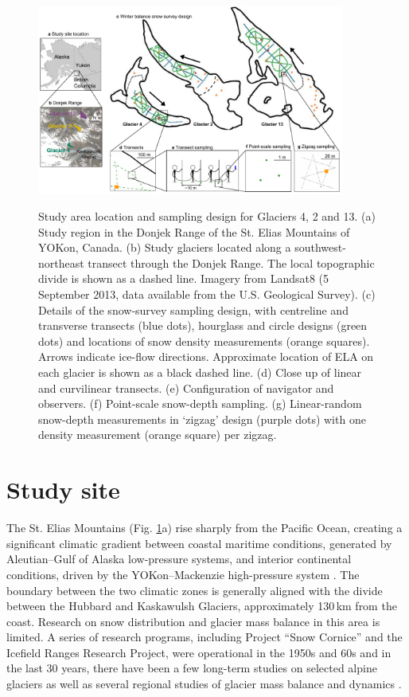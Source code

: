\documentclass[twocolumn, letterpaper]{igs}
\begin{document}
\begin{figure}
	\centering
	\includegraphics[width =0.9\textwidth]{Sampling.pdf}\\
	\caption{Study area location and sampling design for Glaciers 4, 2 and 13. (a) Study region in the Donjek Range of the St. Elias Mountains of YOKon, Canada. (b) Study glaciers located along a southwest-northeast transect through the Donjek Range. The local topographic divide is shown as a dashed line. Imagery from Landsat8 (5 September 2013, data available from the U.S. Geological Survey). (c) Details of the snow-survey sampling design, with centreline and transverse transects (blue dots), hourglass and circle designs (green dots) and locations of snow density measurements (orange squares). Arrows indicate ice-flow directions. Approximate location of ELA on each glacier is shown as a black dashed line. (d) Close up of linear and curvilinear transects. (e) Configuration of navigator and observers. (f) Point-scale snow-depth sampling. (g) Linear-random snow-depth measurements in `zigzag' design (purple dots) with one density measurement (orange square) per zigzag.}
	\label{fig:Sampling}
\end{figure}

\section{Study site}

The St. Elias Mountains (Fig. \ref{fig:Sampling}a) rise sharply from the Pacific Ocean, creating a significant climatic gradient between coastal maritime conditions, generated by Aleutian--Gulf of Alaska low-pressure systems, and interior continental conditions, driven by the YOKon--Mackenzie high-pressure system \citep{Taylor1969}. The boundary between the two climatic zones is generally aligned with the divide between the Hubbard and Kaskawulsh Glaciers, approximately 130\,km from the coast. Research on snow distribution and glacier mass balance in this area is limited. A series of research programs, including Project ``Snow Cornice''  and the Icefield Ranges Research Project, were operational in the 1950s and 60s \citep{Wood1948, Danby2003} and in the last 30 years, there have been a few long-term studies on selected alpine glaciers \citep[e.g.][]{Clarke2014} as well as several regional studies of glacier mass balance and dynamics \citep[e.g.][]{Arendt2008, Burgess2013,Waechter2015}.
\end{document}
